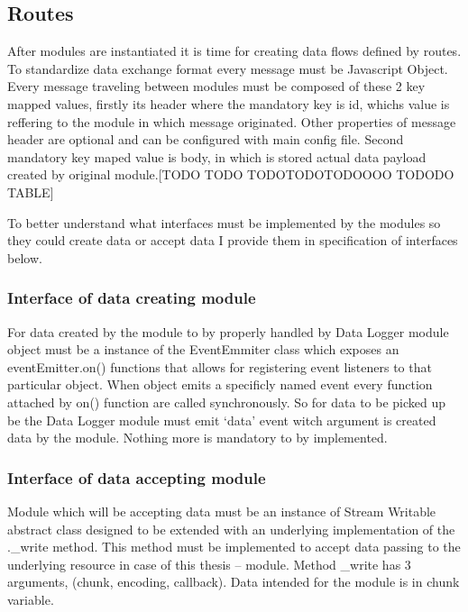 \subsection{Routes} %
\label{sub:routes}
After modules are instantiated it is time for creating data flows defined by routes. To standardize data exchange format every message must be Javascript Object. Every message traveling between modules must be composed of these 2 key mapped values, firstly its header where the mandatory key is id, whichs value is reffering to the module in which message originated. Other properties of message header are optional and can be configured with main config file. Second mandatory key maped value is body, in which is stored actual data payload created by original module.[TODO TODO TODOTODOTODOOOO TODODO TABLE]

To better understand what interfaces must be implemented by the modules so they could create data or accept data I provide them in specification of interfaces below.
\subsubsection{Interface of data creating module} %
\label{ssub:interface_of_data_creating_module}
For data created by the module to by properly handled by Data Logger module object must be a instance of the EventEmmiter class which exposes an eventEmitter.on() functions that allows for registering event listeners to that particular object. When object emits a specificly named event every function attached by on() function are called synchronously. So for data to be picked up be the Data Logger module must emit `data' event witch argument is created data by the module. Nothing more is mandatory to by implemented.

\subsubsection{Interface of data accepting module} %
\label{ssub:interface_of_data_accepting_module}
Module which will be accepting data must be an instance of Stream Writable abstract class designed to be extended with an underlying implementation of the .\_write method. This method must be implemented to accept data passing to the underlying resource in case of this thesis -- module. Method \_write  has 3 arguments, (chunk, encoding, callback). Data intended for the module is in chunk variable.



